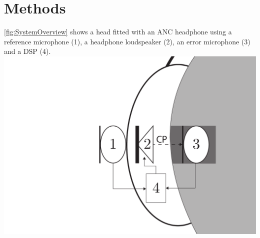 \section{Methods}
\autoref{fig:SystemOverview} shows a head fitted with an ANC headphone using a reference microphone (1), a headphone loudspeaker (2), an error microphone (3) and a DSP (4).
{
	\includegraphics[width=0.9\columnwidth]{figures/ArticleIllustrations/BasicOverviewZoomed}
	\label{fig:SystemOverview}
}





